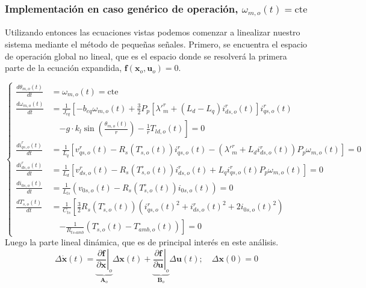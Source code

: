 \documentclass[12pt, a4paper,journal, onecolumn, compsoc]{IEEEtran}
\begin{document}
\subsubsection{Implementación en caso genérico de operación, \(\omega_{m,o}(t)=\mathrm{cte}\)}
Utilizando entonces las ecuaciones vistas podemos comenzar a linealizar nuestro sistema mediante el método de pequeñas señales.
Primero, se encuentra el espacio de operación global no lineal, que es el espacio donde se resolverá la primera parte de la ecuación expandida, $\bm{f}(\bm{x}_o,\bm{u}_o)=0$.

\begin{equation}
\left\{
    \begin{aligned}
        \frac{d\theta_{m,o}(t)}{dt} &= \omega_{m,o}(t) = \text{cte} \\[10pt]
        \frac{d\omega_{m,o}(t)}{dt} &= \frac{1}{J_{eq}} \left[ -b_{eq}\omega_{m,o}(t) + \frac{3}{2}P_p \left[ \lambda'^r_m + (L_d - L_q)i^r_{ds,o}(t) \right] i^r_{qs,o}(t) \right. \\
        &\quad \left. - g \cdot k_l \sin\left(\frac{\theta_{m,o}(t)}{r}\right) - \frac{1}{r}T_{ld,o}(t) \right] = 0 \\[10pt]
        \frac{di^r_{qs,o}(t)}{dt} &= \frac{1}{L_q} \left[ v^r_{qs,o}(t) - R_s(T_{s,o}^\circ(t))i^r_{qs,o}(t) - (\lambda'^r_m + L_d i^r_{ds,o}(t))P_p \omega_{m,o}(t) \right] = 0 \\[10pt]
        \frac{di^r_{ds,o}(t)}{dt} &= \frac{1}{L_d} \left[ v^r_{ds,o}(t) - R_s(T_{s,o}^\circ(t))i^r_{ds,o}(t) + L_q i^r_{qs,o}(t)P_p \omega_{m,o}(t) \right] = 0 \\[10pt]
        \frac{di_{0s,o}(t)}{dt} &= \frac{1}{L_{ls}} \left( v_{0s,o}(t) - R_s(T_{s,o}^\circ(t))i_{0s,o}(t) \right) = 0 \\[10pt]
        \frac{dT_{s,o}^\circ(t)}{dt} &= \frac{1}{C_{ts}} \left[ \frac{3}{2}R_s(T_{s,o}^\circ(t)) \left( i^r_{qs,o}(t)^2 + i^r_{ds,o}(t)^2 + 2i_{0s,o}(t)^2 \right) \right. \\
        &\quad \left. - \frac{1}{R_{ts\text{-}amb}} (T_{s,o}^\circ(t) - T_{amb,o}^\circ(t)) \right] = 0
    \end{aligned}
\right.
\end{equation}
Luego la parte lineal dinámica, que es de principal interés en este análisis.
\begin{equation*}
    \Delta\bm{\dot x}(t) = \underbrace{\left. \frac{\partial \bm f}{\partial \bm x} \right|_o}_{\bm A_o}\Delta\bm x(t) + \underbrace{\left. \frac{\partial \bm f}{\partial \bm u} \right|_o}_{\bm B_o}\Delta\bm u(t); \quad \Delta\bm x(0) = 0
\end{equation*}
\end{document}
